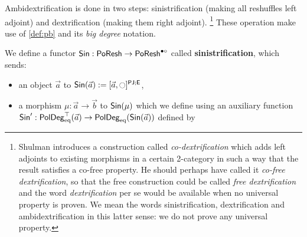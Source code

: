 \documentclass[a4paper]{memoir}
\begin{document}
Ambidextrification is done in two steps: sinistrification (making all reshuffles left adjoint) and dextrification (making them right adjoint).%
\footnote{Shulman \cite{matt} introduces a construction called \emph{co-dextrification} which adds left adjoints to existing morphisms in a certain 2-category in such a way that the result satisfies a co-free property. He should perhaps have called it \emph{co-free dextrification}, so that the free construction could be called \emph{free dextrification} and the word \emph{dextrification} per se would be available when no universal property is proven. We mean the words sinistrification, dextrification and ambidextrification in this latter sense: we do not prove any universal property.}
These operation make use of \cref{def:pb} and its \emph{big degree} notation.

\begin{definition} \label{def:poresh-sin}
	We define a functor ${\mathsf{Sin}} : \mathsf{PoResh} \to \mathsf{PoResh}^{\bullet \circ}$ called \textbf{sinistrification}, which sends:
	\begin{itemize}
		\item an object $\vec a$ to $\Sin(\vec a) := \maskop{[\vec a, \npolar]}{\maskpj}{\maske}$,
		\item a morphism $\mu : \vec a \to \vec b$ to ${\mathsf{Sin}}(\mu)$ which we define
		using an auxiliary function ${\mathsf{Sin}}' : \mathsf{PolDeg}_{\mathrm{eq}}^\top(\vec a) \to \mathsf{PolDeg}_{\mathrm{eq}}({\mathsf{Sin}}(\vec a))$ defined by

\end{itemize}
\end{definition}
\end{document}

